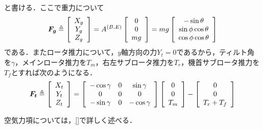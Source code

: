 と書ける．ここで重力について
\begin{equation}
  \mbox{\boldmath $F_g$} \triangleq
  \left[
  \begin{array}{ccc}
    X_g \\
    Y_g \\
    Z_g
  \end{array}
  \right] =
  A^{(B,E)}
  \left[
  \begin{array}{ccc}
    0 \\
    0 \\
    mg
  \end{array}
  \right] = mg
  \left[
  \begin{array}{ccc}
    -\sin\theta \\
    \sin\phi\cos\theta \\
    \cos\phi\cos\theta
  \end{array}
  \right]
  \label{eq:F_g}
\end{equation}
である．またロータ推力について，$y$軸方向の力$Y_t=0$であるから，ティルト角を$\gamma$，メインロータ推力を$T_m$，右左サブロータ推力を$T_r$，機首サブロータ推力を$T_f$とすれば次のようになる．
\begin{equation}
  \mbox{\boldmath $F_t$} \triangleq
  \left[
    \begin{array}{ccc}
      X_t \\
      Y_t \\
      Z_t
    \end{array}
  \right] =
  \left[
    \begin{array}{ccc}
      -\cos\gamma & 0 & \sin\gamma \\
      0 & 0 & 0 \\
      -\sin\gamma & 0 & -\cos\gamma
    \end{array}
  \right]
  \left[
    \begin{array}{ccc}
      0 \\
      0 \\
      T_m
    \end{array}
  \right] -
  \left[
    \begin{array}{ccc}
      0 \\
      0 \\
      T_r + T_f
    \end{array}
  \right]
  \label{eq:F_t}
\end{equation}

空気力項については，\ref{}で詳しく述べる．

